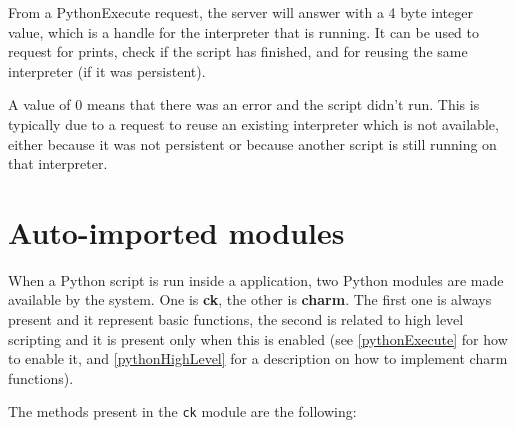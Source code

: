 From a PythonExecute request, the server will answer with a 4 byte integer
value, which is a handle for the interpreter that is running. It can be used to
request for prints, check if the script has finished, and for reusing the same
interpreter (if it was persistent).

A value of 0 means that there was an error and the script didn't run. This is
typically due to a request to reuse an existing interpreter which is not
available, either because it was not persistent or because another script is
still running on that interpreter.


\section{Auto-imported modules}
\label{pythonModules}

When a Python script is run inside a \charmpp{} application, two Python modules
are made available by the system. One is \textbf{ck}, the other is
\textbf{charm}. The first one is always present and it represent basic
functions, the second is related to high level scripting and it is present only
when this is enabled (see \ref{pythonExecute} for how to enable it, and
\ref{pythonHighLevel} for a description on how to implement charm functions).

The methods present in the \texttt{ck} module are the following:

